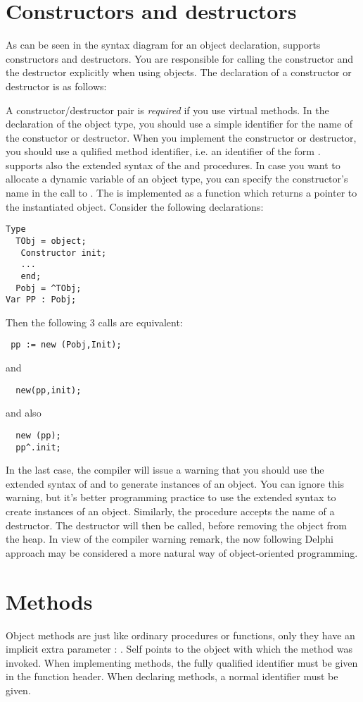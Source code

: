 \documentclass{report}
\begin{document}
\section{Constructors and destructors }
\label{se:constructdestruct}
As can be seen in the syntax diagram for an object declaration, \fpc supports
constructors and destructors. You are responsible for calling the
constructor and the destructor explicitly when using objects.
The declaration of a constructor or destructor is as follows:

A constructor/destructor pair is {\em required} if you use virtual methods.
In the declaration of the object type, you should use a simple identifier
for the name of the constuctor or destructor. When you implement the
constructor or destructor, you should use a qulified method identifier,
i.e. an identifier of the form .
\fpc supports also the extended syntax of the  and 
procedures. In case you want to allocate a dynamic variable of an object
type, you can specify the constructor's name in the call to .
The  is implemented as a function which returns a pointer to the
instantiated object. Consider the following declarations:
\begin{verbatim}
Type
  TObj = object;
   Constructor init;
   ...
   end;
  Pobj = ^TObj;
Var PP : Pobj;
\end{verbatim}
Then the following 3 calls are equivalent:
\begin{verbatim}
 pp := new (Pobj,Init);
\end{verbatim}
and
\begin{verbatim}
  new(pp,init);
\end{verbatim}
and also
\begin{verbatim}
  new (pp);
  pp^.init;
\end{verbatim}
In the last case, the compiler will issue a warning that you should use the
extended syntax of  and  to generate instances of an
object. You can ignore this warning, but it's better programming practice to
use the extended syntax to create instances of an object.
Similarly, the  procedure accepts the name of a destructor. The
destructor will then be called, before removing the object from the heap.
In view of the compiler warning remark, the now following Delphi approach may
be considered a more natural way of object-oriented programming.
\section{Methods}
Object methods are just like ordinary procedures or functions, only they
have an implicit extra parameter : . Self points to the object
with which the method was invoked.
When implementing methods, the fully qualified identifier must be given
in the function header. When declaring methods, a normal identifier must be
given.
\end{document}
